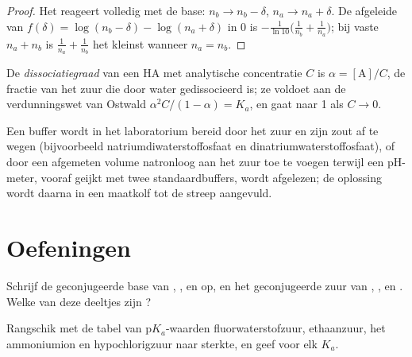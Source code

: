 \begin{proof}
Het  reageert volledig met de base: $n_b \to n_b - \delta$,
$n_a \to n_a + \delta$. De afgeleide van $f(\delta) = \log(n_b - \delta) -
\log(n_a + \delta)$ in 0 is $-\frac{1}{\ln10}\big(\frac{1}{n_b} +
\frac{1}{n_a}\big)$; bij vaste $n_a + n_b$ is $\frac1{n_a} + \frac1{n_b}$
het kleinst wanneer $n_a = n_b$.
\end{proof}

\begin{definition}[Dissociatiegraad]\label{def:b1:predominant-reaction:dissociation}
De \emph{dissociatiegraad} van een  HA
met analytische concentratie $C$ is $\alpha = [\mathrm{A}]/C$, de fractie
van het zuur die door water gedissocieerd is; ze voldoet aan de
verdunningswet van Ostwald $\alpha^2C/(1 - \alpha) = K_a$, en gaat naar 1
als $C \to 0$.
\end{definition}

\begin{inthelab}
Een buffer wordt in het laboratorium bereid door het zuur en zijn zout af
te wegen (bijvoorbeeld natriumdiwaterstoffosfaat en
dinatriumwaterstoffosfaat), of door een afgemeten volume
natronloog aan het zuur toe te voegen terwijl een pH-meter, vooraf
geijkt met twee standaardbuffers, wordt afgelezen; de oplossing wordt
daarna in een maatkolf tot de streep aangevuld.
\end{inthelab}

\section{Oefeningen}

\begin{exercise}[$\star$]\label{exo:b1:predominant-reaction:1}
Schrijf de geconjugeerde base van , ,  en
 op, en het geconjugeerde zuur van , ,
 en . Welke van deze deeltjes zijn ?
\end{exercise}

\begin{exercise}[$\star$]\label{exo:b1:predominant-reaction:2}
Rangschik met de tabel van $\mathrm{p}K_a$-waarden fluorwaterstofzuur, ethaanzuur,
het ammoniumion en hypochlorigzuur naar sterkte, en geef voor elk $K_a$.
\end{exercise}

